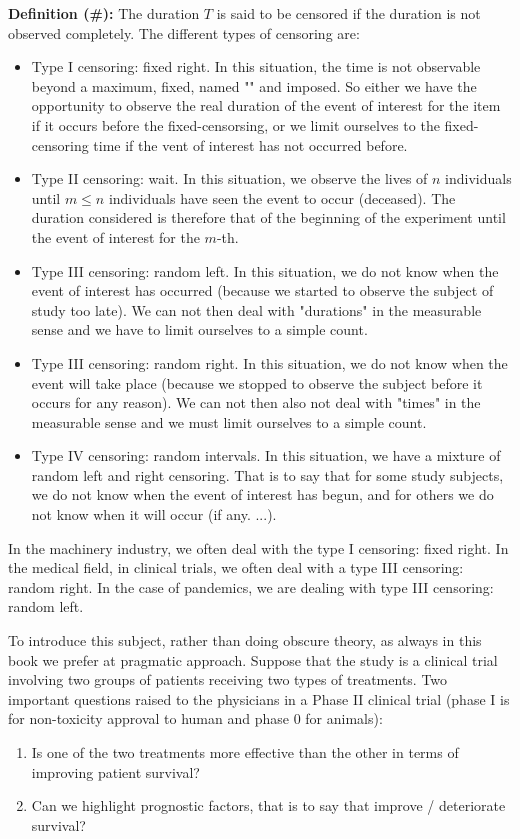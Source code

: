 	\textbf{Definition (\#\mydef):} The duration $T$ is said to be censored if the duration is not observed completely. The different types of censoring are:
	\begin{itemize}
		\item Type I censoring: fixed right. In this situation, the time is not observable beyond a maximum, fixed, named "" and imposed. So either we have the opportunity to observe the real duration of the event of interest for the item if it occurs before the fixed-censorsing, or we limit ourselves to the fixed-censoring time if the vent of interest has not occurred before.
		
		\item Type II censoring: wait. In this situation, we observe the lives of $n$ individuals until $m\leq n$ individuals have seen the event to occur (deceased). The duration considered is therefore that of the beginning of the experiment until the event of interest for the $m$-th.
		
		\item Type III censoring: random left. In this situation, we do not know when the event of interest has occurred (because we started to observe the subject of study too late). We can not then deal with "durations" in the measurable sense and we have to limit ourselves to a simple count.
		
		\item Type III censoring: random right. In this situation, we do not know when the event will take place (because we stopped to observe the subject before it occurs  for any reason). We can not then also not deal with "times" in the measurable sense and we must limit ourselves to a simple count.
		
		\item Type IV censoring: random intervals. In this situation, we have a mixture of random left and right censoring. That is to say that for some study subjects, we do not know when the event of interest has begun, and for others we do not know when it will occur (if any. ...).
	\end{itemize}
	In the machinery industry, we often deal with the type I censoring: fixed right. In the medical field, in clinical trials, we often deal with a type III censoring: random right. In the case of pandemics, we are dealing with type III censoring: random left.
	
	To introduce this subject, rather than doing obscure theory, as always in this book we prefer at pragmatic approach. Suppose that the study is a clinical trial involving two groups of patients receiving two types of treatments. Two important questions raised to the physicians in a Phase II clinical trial (phase I is for non-toxicity approval to human and phase 0 for animals):
	\begin{enumerate}
		\item Is one of the two treatments more effective than the other in terms of improving patient survival?
		
		\item Can we highlight prognostic factors, that is to say that improve / deteriorate survival?
	\end{enumerate}
	
